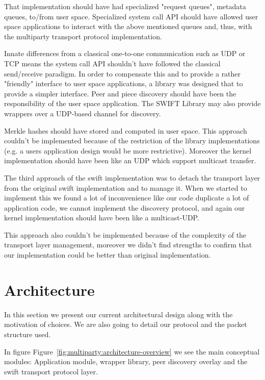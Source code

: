 That implementation should have had specialized "request queues", metadata
queues, to/from user space. Specialized system call API should have allowed
user space applications to interact with the above mentioned queues and, thus,
with the multiparty transport protocol implementation.

Innate differences from a classical one-to-one communication such as UDP or
TCP means the system call API shouldn't have followed the classical
send/receive paradigm. In order to compensate this and to provide a rather
"friendly" interface to user space applications, a library was designed that
to provide a simpler interface. Peer and piece discovery should have been the
responsibility of the user space application. The SWIFT Library may also
provide wrappers over a UDP-based channel for discovery.

Merkle hashes should have stored and computed in user space. This approach
couldn't be implemented because of the restriction of the library
implementations (e.g. a users application design would be more restrictive).
Moreover the kernel implementation should have been like an UDP which support
multicast transfer.

The third approach of the swift implementation was to detach the transport
layer from the original swift implementation and to manage it. When we started
to implement this we found a lot of inconvenience like our code duplicate a
lot of application code, we cannot implement the discovery protocol, and again
our kernel implementation should have been like a multicast-UDP.

This approach also couldn't be implemented because of the complexity of the
transport layer management, moreover we didn't find strengths to confirm that
our implementation could be better than original implementation.

\section{Architecture}
\label{sec:multiparty:architecture}

In this section we present our current architectural design along with the
motivation of choices. We are also going to detail our protocol and the packet
structure used.

In figure Figure~\ref{fig:multiparty:architecture-overview} we see the main
conceptual modules: Application module, wrapper library, peer discovery
overlay and the swift transport protocol layer.

